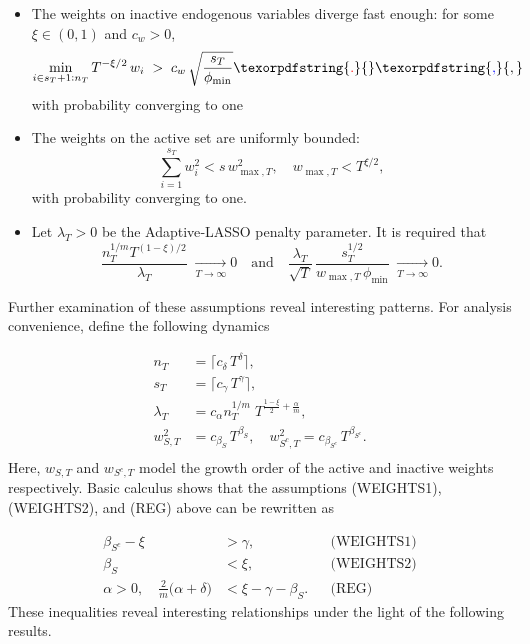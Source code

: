 \documentclass[10pt,a4paper,oneside]{article}
\providecommand{\DIFaddtex}[1]{{\protect\color{blue} \sf #1}} %
\providecommand{\DIFdeltex}[1]{{\protect\color{red} \scriptsize #1}} %
\providecommand{\DIFaddbegin}{} %
\providecommand{\DIFaddend}{} %
\providecommand{\DIFdelbegin}{} %
\providecommand{\DIFdelend}{} %
\providecommand{\DIFadd}[1]{\texorpdfstring{\DIFaddtex{#1}}{#1}} %
\providecommand{\DIFdel}[1]{\texorpdfstring{\DIFdeltex{#1}}{}} %
\newcommand{\DIFscaledelfig}{0.5}
\newlength{\DIFdelgraphicswidth} %
\newlength{\DIFdelgraphicsheight} %
\newcommand{\DIFaddincludegraphics}[2][]{{\color{blue}\fbox{\DIFOincludegraphics[#1]{#2}}}} %
\newcommand{\DIFdelincludegraphics}[2][]{%
\sbox{\DIFdelgraphicsbox}{\DIFOincludegraphics[#1]{#2}}%
\settoboxwidth{\DIFdelgraphicswidth}{\DIFdelgraphicsbox} %
\settoboxtotalheight{\DIFdelgraphicsheight}{\DIFdelgraphicsbox} %
\scalebox{\DIFscaledelfig}{%
\parbox[b]{\DIFdelgraphicswidth}{\usebox{\DIFdelgraphicsbox}\\[-\baselineskip] \rule{\DIFdelgraphicswidth}{0em}}\llap{\resizebox{\DIFdelgraphicswidth}{\DIFdelgraphicsheight}{%
\setlength{\unitlength}{\DIFdelgraphicswidth}%
\begin{picture}(1,1)%
\thicklines\linethickness{2pt} %
{\color[rgb]{1,0,0}\put(0,0){\framebox(1,1){}}}%
{\color[rgb]{1,0,0}\put(0,0){\line( 1,1){1}}}%
{\color[rgb]{1,0,0}\put(0,1){\line(1,-1){1}}}%
\end{picture}%
}\hspace*{3pt}}} %
} %
\DeclareRobustCommand{\DIFaddbegin}{\DIFOaddbegin \let\includegraphics\DIFaddincludegraphics} %
\DeclareRobustCommand{\DIFaddend}{\DIFOaddend \let\includegraphics\DIFOincludegraphics} %
\DeclareRobustCommand{\DIFdelbegin}{\DIFOdelbegin \let\includegraphics\DIFdelincludegraphics} %
\DeclareRobustCommand{\DIFdelend}{\DIFOaddend \let\includegraphics\DIFOincludegraphics} %
\begin{document}
\begin{itemize}
\begin{enumerate}
    \end{enumerate}

  \item[(WEIGHTS1)] The weights on inactive endogenous variables diverge fast enough: for some $\xi\in(0,1)$ and $c_w>0$,
  \[
    \min_{i \in s_T + 1 : n_T} T^{-\xi/2}\,w_i \;>\; c_w\,\sqrt{\frac{s_T}{\phi_{\min}}}\DIFdelbegin \DIFdel{.
  }\DIFdelend \DIFaddbegin \DIFadd{,
  }\DIFaddend \]
  with probability converging to one
  \item[(WEIGHTS2)] The weights on the active set are uniformly bounded: 
  \[
     \sum_{i=1}^{s_T} w_i^2 < s\,w_{\max, T}^2,\quad w_{\max, T}<T^{\xi/2},
  \]
  with probability converging to one.
\end{itemize}

\begin{itemize}
    \item[(REG)] Let $\lambda_T>0$ be the Adaptive‐LASSO penalty parameter.  It is required that
\[
   \frac{n_T^{1/m}T^{(1-\xi)/2}}{\lambda_T}\;\xrightarrow[T \to \infty]{} 0
   \quad\text{and}\quad
   \frac{\lambda_T}{\sqrt{T}}\,\frac{s_T^{1/2}}{w_{\max, T}\,\phi_{\min}}\; \xrightarrow[T \to \infty]{} 0.
\]
\end{itemize}

Further examination of these assumptions reveal interesting patterns. For analysis convenience, define the following dynamics

\begin{align*}
n_T &= \lceil c_{\delta}\,T^{\delta} \rceil, \\[6pt]
s_T &= \lceil c_{\gamma}\,T^{\gamma} \rceil, \\[6pt]
\lambda_T &= c_{\alpha} n_T^{1/m}\;T^{\frac{1-\xi}{2} + \frac{\alpha}{m}}, \\[6pt]
w_{S,T}^2 &= c_{\beta_S}\,T^{\beta_S}, 
\quad
w_{S^c,T}^2 = c_{\beta_{S^c}}\,T^{\beta_{S^c}}.
\\[4pt]
\end{align*}
Here, $w_{S,T}$ and $w_{S^c,T}$ model the growth order of the active and inactive weights respectively. Basic calculus shows that the assumptions (WEIGHTS1), (WEIGHTS2), and (REG) above can be rewritten as

\begin{align*}
\beta_{S^c} - \xi &> \gamma, 
  &&\text{(WEIGHTS1)}\\
\beta_S &< \xi, 
  &&\text{(WEIGHTS2)}\\
\alpha > 0,\quad 
\frac{2}{m}\bigl(\alpha + \delta\bigr) &< \xi - \gamma - \beta_S. 
  &&\text{(REG)}
\end{align*}
These inequalities reveal interesting relationships under the light of the following results.
\end{document}
